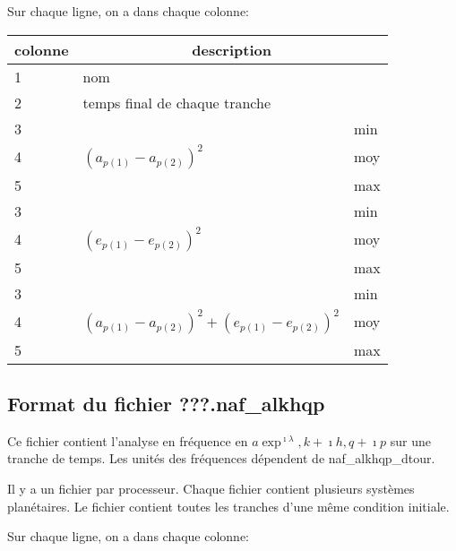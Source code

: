\documentclass[11pt]{article}
\begin{document}
Sur chaque ligne, on a dans chaque colonne: 

\begin{tabularx}{\textwidth}{|l|l|X|}
 \hline
 colonne &      \multicolumn{2}{c|}{description} \\ \hline
1  &    \multicolumn{2}{l|}{nom} \\ \hline
2  &    \multicolumn{2}{l|}{temps final de chaque tranche} \\ \hline
3 &    & min\\
4 &  $(a_{p(1)}-a_{p(2)})^2$ & moy\\
5 & &   max\\ \hline
3 &    & min\\
4 &  $(e_{p(1)}-e_{p(2)})^2$ & moy\\
5 & &   max\\ \hline
3 &    & min\\
4 &  $(a_{p(1)}-a_{p(2)})^2+(e_{p(1)}-e_{p(2)})^2$ & moy\\
5 & &   max\\ \hline
\end{tabularx}

\subsection{Format du fichier {\bf ???.naf\_alkhqp} }

Ce fichier contient l'analyse en fr\'equence en $a\exp^{\imath\lambda}, k+\imath h, q+\imath p$ sur une tranche de temps. Les unit\'es des fr\'equences d\'ependent de naf\_alkhqp\_dtour.

 Il y a un fichier par processeur. Chaque fichier contient plusieurs syst\`emes plan\'etaires. Le fichier contient toutes les tranches d'une m\^eme  condition initiale.


Sur chaque ligne, on a dans chaque colonne: 
\end{document}
